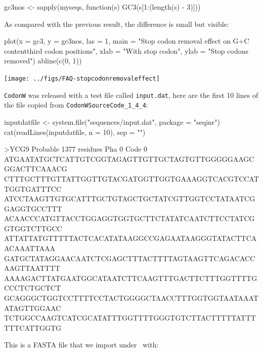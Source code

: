 \documentclass{article}
\begin{document}
\begin{Schunk}
\begin{Sinput}
 gc3nos <- sapply(myseqs, function(s) GC3(s[1:(length(s) - 
     3)]))
\end{Sinput}
\end{Schunk}

As compared with the previous result, the difference is small but visible:

\begin{Schunk}
\begin{Sinput}
 plot(x = gc3, y = gc3nos, las = 1, main = "Stop codon removal effect on G+C content\nin third codon positions", 
     xlab = "With stop codon", ylab = "Stop codons removed")
 abline(c(0, 1))
\end{Sinput}
\end{Schunk}
\texttt{[image: ../figs/FAQ-stopcodonremovaleffect]}

\texttt{CodonW} was released with a test file called \texttt{input.dat}, here are
the first 10 lines of the file copied from \texttt{CodonWSourceCode\_1\_4\_4}:

\begin{Schunk}
\begin{Sinput}
 inputdatfile <- system.file("sequences/input.dat", package = "seqinr")
 cat(readLines(inputdatfile, n = 10), sep = "\n")
\end{Sinput}
\begin{Soutput}
>YCG9 Probable          1377 residues Pha 0 Code 0
ATGAATATGCTCATTGTCGGTAGAGTTGTTGCTAGTGTTGGGGGAAGCGGACTTCAAACG
CTTTGCTTTGTTATTGGTTGTACGATGGTTGGTGAAAGGTCACGTCCATTGGTGATTTCC
ATCCTAAGTTGTGCATTTGCTGTAGCTGCTATCGTTGGTCCTATAATCGGAGGTGCCTTT
ACAACCCATGTTACCTGGAGGTGGTGCTTCTATATCAATCTTCCTATCGGTGGTCTTGCC
ATTATTATGTTTTTACTCACATATAAGGCCGAGAATAAGGGTATACTTCAACAAATTAAA
GATGCTATAGGAACAATCTCGAGCTTTACTTTTAGTAAGTTCAGACACCAAGTTAATTTT
AAAAGACTTATGAATGGCATAATCTTCAAGTTTGACTTCTTTGGTTTTGCCCTCTGCTCT
GCAGGGCTGGTCCTTTTCCTACTGGGGCTAACCTTTGGTGGTAATAAATATAGTTGGAAC
TCTGGCCAAGTCATCGCATATTTGGTTTTGGGTGTCTTACTTTTTATTTTTTCATTGGTG
\end{Soutput}
\end{Schunk}

This is a FASTA file that we import under \Rlogo{}~with:
\end{document}
